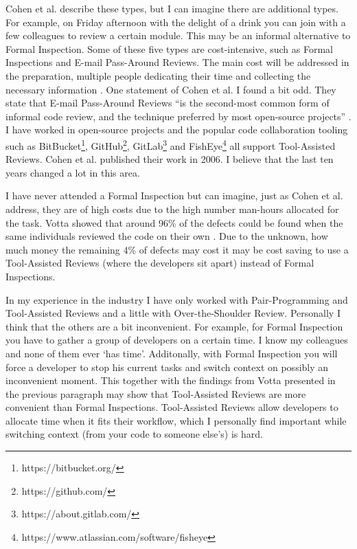 Cohen et al. describe these types, but I can imagine there are additional types.
For example, on Friday afternoon with the delight of a drink you can join with a few colleagues to review a certain module. This may be an informal alternative to Formal Inspection.
Some of these five types are cost-intensive, such as Formal Inspections and E-mail Pass-Around Reviews.
The main cost will be addressed in the preparation, multiple people dedicating their time and collecting the necessary information \autocite[23--38]{cohen2006best}.
One statement of Cohen et al. I found a bit odd.
They state that E-mail Pass-Around Reviews ``is the second-most common form of informal code review, and the technique preferred by most open-source projects'' \autocite[30]{cohen2006best}.
I have worked in open-source projects and the popular code collaboration tooling such as
BitBucket\footnote{https://bitbucket.org/},
GitHub\footnote{https://github.com/},
GitLab\footnote{https://about.gitlab.com/}
and FishEye\footnote{https://www.atlassian.com/software/fisheye}
all support Tool-Assisted Reviews.
Cohen et al. published their work in 2006. I believe that the last ten years changed a lot in this area.

I have never attended a Formal Inspection but can imagine, just as Cohen et al. address, they are of high costs due to the high number man-hours allocated for the task.
Votta showed that around 96\% of the defects could be found when the same individuals reviewed the code on their own \autocite[110]{Votta:1993:INM:256428.167070}.
Due to the unknown, how much money the remaining 4\% of defects may cost it may be cost saving to use a Tool-Assisted Reviews (where the developers sit apart) instead of Formal Inspections.

In my experience in the industry I have only worked with Pair-Programming and Tool-Assisted Reviews and a little with Over-the-Shoulder Review. Personally I think that the others are a bit inconvenient.
For example, for Formal Inspection you have to gather a group of developers on a certain time.
I know my colleagues and none of them ever `has time'.
Additonally, with Formal Inspection you will force a developer to stop his current tasks and switch context on possibly an inconvenient moment.
This together with the findings from Votta presented in the previous paragraph may show that Tool-Assisted Reviews are more convenient than Formal Inspections.
Tool-Assisted Reviews allow developers to allocate time when it fits their workflow, which I personally find important while switching context (from your code to someone else's) is hard.

